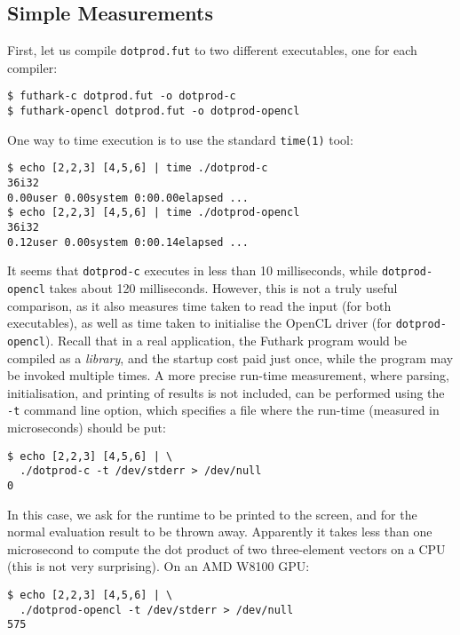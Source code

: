 \documentclass[oneside,11pt]{book}
\begin{document}
\subsection{Simple Measurements}

First, let us compile \texttt{dotprod.fut} to two different
executables, one for each compiler:

\begin{verbatim}
$ futhark-c dotprod.fut -o dotprod-c
$ futhark-opencl dotprod.fut -o dotprod-opencl
\end{verbatim}

One way to time execution is to use the standard \texttt{time(1)}
tool:

\begin{verbatim}
$ echo [2,2,3] [4,5,6] | time ./dotprod-c
36i32
0.00user 0.00system 0:00.00elapsed ...
$ echo [2,2,3] [4,5,6] | time ./dotprod-opencl
36i32
0.12user 0.00system 0:00.14elapsed ...
\end{verbatim}

It seems that \texttt{dotprod-c} executes in less than 10
milliseconds, while \texttt{dotprod-opencl} takes about 120
milliseconds.  However, this is not a truly useful comparison, as it
also measures time taken to read the input (for both executables), as
well as time taken to initialise the OpenCL driver (for
\texttt{dotprod-opencl}).  Recall that in a real application, the
Futhark program would be compiled as a \textit{library}, and the
startup cost paid just once, while the program may be invoked multiple
times.  A more precise run-time measurement, where parsing,
initialisation, and printing of results is not included, can be
performed using the \texttt{-t} command line option, which specifies a
file where the run-time (measured in microseconds) should be put:

\begin{verbatim}
$ echo [2,2,3] [4,5,6] | \
  ./dotprod-c -t /dev/stderr > /dev/null
0
\end{verbatim}

In this case, we ask for the runtime to be printed to the screen, and
for the normal evaluation result to be thrown away.  Apparently it
takes less than one microsecond to compute the dot product of two
three-element vectors on a CPU (this is not very surprising).  On an
AMD W8100 GPU:

\begin{verbatim}
$ echo [2,2,3] [4,5,6] | \
  ./dotprod-opencl -t /dev/stderr > /dev/null
575
\end{verbatim}
\end{document}
